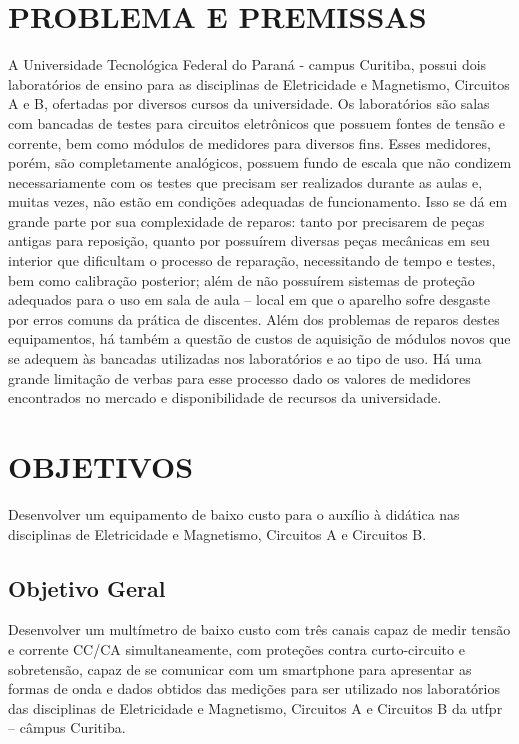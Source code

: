 \section{PROBLEMA E PREMISSAS}\label{sec:probpremiss}
A Universidade Tecnológica Federal do Paraná - campus Curitiba, possui dois laboratórios de ensino para as disciplinas de Eletricidade e Magnetismo, Circuitos A e B, ofertadas por diversos cursos da universidade. Os laboratórios são salas com bancadas de testes para circuitos eletrônicos que possuem fontes de tensão e corrente, bem como módulos de medidores para diversos fins.
Esses medidores, porém, são completamente analógicos, possuem fundo de escala que não condizem necessariamente com os testes que precisam ser realizados durante as aulas e, muitas vezes, não estão em condições adequadas de funcionamento. Isso se dá em grande parte por sua complexidade de reparos: tanto por precisarem de peças antigas para reposição, quanto por possuírem diversas peças mecânicas em seu interior que dificultam o processo de reparação, necessitando de tempo e testes, bem como calibração posterior; além de não possuírem sistemas de proteção adequados para o uso em sala de aula – local em que o aparelho sofre desgaste por erros comuns da prática de discentes.
Além dos problemas de reparos destes equipamentos, há também a questão de custos de aquisição de módulos novos que se adequem às bancadas utilizadas nos laboratórios e ao tipo de uso. Há uma grande limitação de verbas para esse processo dado os valores de medidores encontrados no mercado e disponibilidade de recursos da universidade.

\section{OBJETIVOS}\label{sec:objetivos}
Desenvolver um equipamento de baixo custo para o auxílio à didática nas disciplinas de Eletricidade e Magnetismo, Circuitos A e Circuitos B.

\subsection{Objetivo Geral}\label{sec:objgeral}
Desenvolver um multímetro de baixo custo com três canais capaz de medir tensão e corrente \gls{CC}/\gls{CA} simultaneamente, com proteções contra curto-circuito e sobretensão, capaz de se comunicar com um smartphone para apresentar as formas de onda e dados obtidos das medições para ser utilizado nos laboratórios das disciplinas de Eletricidade e Magnetismo, Circuitos A e Circuitos B da \gls{utfpr} – câmpus Curitiba.

